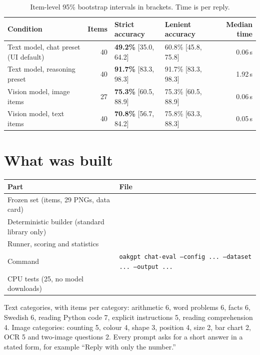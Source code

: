 \documentclass[11pt,a4paper]{article}
\newcommand{\code}[1]{\texttt{#1}}
\begin{document}
\begin{table}[H]
\centering\small
\begin{tabularx}{\textwidth}{@{}Yrllr@{}}
\toprule
Condition & Items & Strict accuracy & Lenient accuracy & Median time \\
\midrule
Text model, chat preset (UI default) & 40 & \textbf{49.2\%} [35.0, 64.2] & 60.8\% [45.8, 75.8] & 0.06\,s \\
Text model, reasoning preset & 40 & \textbf{91.7\%} [83.3, 98.3] & 91.7\% [83.3, 98.3] & 1.92\,s \\
Vision model, image items & 27 & \textbf{75.3\%} [60.5, 88.9] & 75.3\% [60.5, 88.9] & 0.06\,s \\
Vision model, text items & 40 & \textbf{70.8\%} [56.7, 84.2] & 75.8\% [63.3, 88.3] & 0.05\,s \\
\bottomrule
\end{tabularx}
\caption*{Item-level 95\% bootstrap intervals in brackets. Time is per reply.}
\end{table}

\tableofcontents

\section{What was built}

\begin{center}\small
\begin{tabularx}{\textwidth}{@{}Yl@{}}
\toprule
Part & File \\
\midrule
Frozen set (items, 29 PNGs, data card) &  \\
Deterministic builder (standard library only) &  \\
Runner, scoring and statistics &  \\
Command & \code{oakgpt chat-eval --config ... --dataset ... --output ...} \\
CPU tests (25, no model downloads) &  \\
\bottomrule
\end{tabularx}
\end{center}

Text categories, with items per category: arithmetic 6, word problems 6, facts 6,
Swedish 6, reading Python code 7, explicit instructions 5, reading comprehension 4. Image
categories: counting 5, colour 4, shape 3, position 4, size 2, bar chart 2, OCR 5 and
two-image questions 2. Every prompt asks for a short answer in a stated form, for example
``Reply with only the number.''
\end{document}
